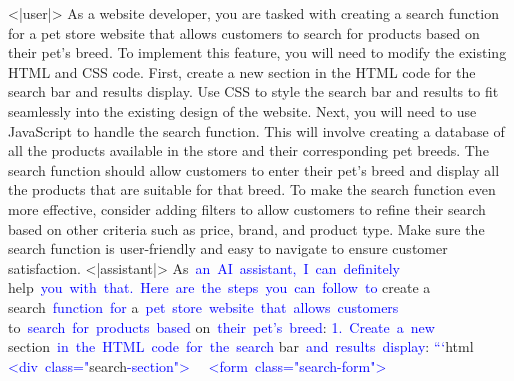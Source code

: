 \documentclass{article}
\begin{document}
\begin{tcolorbox}[colframe=black,colback=white]
<|user|>
As a website developer, you are tasked with creating a search function for a pet store website that allows customers to search for products based on their pet's breed. To implement this feature, you will need to modify the existing HTML and CSS code. 
First, create a new section in the HTML code for the search bar and results display. Use CSS to style the search bar and results to fit seamlessly into the existing design of the website. 
Next, you will need to use JavaScript to handle the search function. This will involve creating a database of all the products available in the store and their corresponding pet breeds. The search function should allow customers to enter their pet's breed and display all the products that are suitable for that breed. 
To make the search function even more effective, consider adding filters to allow customers to refine their search based on other criteria such as price, brand, and product type. Make sure the search function is user-friendly and easy to navigate to ensure customer satisfaction.
<|assistant|>
As\textcolor{blue}{~an}\textcolor{blue}{~AI}\textcolor{blue}{~assistant}\textcolor{blue}{,}\textcolor{blue}{~I}\textcolor{blue}{~can}\textcolor{blue}{~definitely} help\textcolor{blue}{~you}\textcolor{blue}{~with}\textcolor{blue}{~that}\textcolor{blue}{.}\textcolor{blue}{~Here}\textcolor{blue}{~are}\textcolor{blue}{~the}\textcolor{blue}{~steps}\textcolor{blue}{~you}\textcolor{blue}{~can}\textcolor{blue}{~follow}\textcolor{blue}{~to} create a search\textcolor{blue}{~function}\textcolor{blue}{~for} a\textcolor{blue}{~pet}\textcolor{blue}{~store}\textcolor{blue}{~website}\textcolor{blue}{~that}\textcolor{blue}{~allows}\textcolor{blue}{~customers} to\textcolor{blue}{~search}\textcolor{blue}{~for}\textcolor{blue}{~products}\textcolor{blue}{~based} on\textcolor{blue}{~their}\textcolor{blue}{~pet}\textcolor{blue}{'s}\textcolor{blue}{~breed}:
\textcolor{blue}{1}\textcolor{blue}{.}\textcolor{blue}{~Create}\textcolor{blue}{~a}\textcolor{blue}{~new} section\textcolor{blue}{~in}\textcolor{blue}{~the}\textcolor{blue}{~HTML}\textcolor{blue}{~code}\textcolor{blue}{~for}\textcolor{blue}{~the}\textcolor{blue}{~search} bar\textcolor{blue}{~and}\textcolor{blue}{~results}\textcolor{blue}{~display}:
\textcolor{blue}{```}html\textcolor{blue}{
}\textcolor{blue}{<div}\textcolor{blue}{~class}\textcolor{blue}{="}search\textcolor{blue}{-section}\textcolor{blue}{">
}\textcolor{blue}{~}\textcolor{blue}{~<}\textcolor{blue}{form}\textcolor{blue}{~class}\textcolor{blue}{="}\textcolor{blue}{search}\textcolor{blue}{-form}\textcolor{blue}{">
}
\end{tcolorbox}
\end{document}
